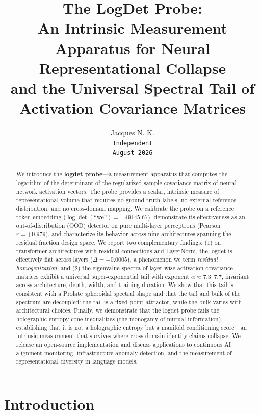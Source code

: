 \documentclass[12pt,a4paper]{article}
\title{
    {\Large The LogDet Probe:}\\
    {\large An Intrinsic Measurement Apparatus for Neural Representational Collapse\\
    and the Universal Spectral Tail of Activation Covariance Matrices}
}
\author{
    Jacques N. K.\\
    \small\texttt{Independent}\\[4pt]
    \small\texttt{August 2026}
}
\date{}
\begin{document}
\maketitle

\begin{abstract}
We introduce the \textbf{logdet probe}---a measurement apparatus that computes the logarithm of the determinant of the regularized sample covariance matrix of neural network activation vectors. The probe provides a scalar, intrinsic measure of representational volume that requires no ground-truth labels, no external reference distribution, and no cross-domain mapping. We calibrate the probe on a reference token embedding ($\log\det(\text{``we''}) = -49145.67$), demonstrate its effectiveness as an out-of-distribution (OOD) detector on pure multi-layer perceptrons (Pearson $r = +0.979$), and characterize its behavior across nine architectures spanning the residual fraction design space. We report two complementary findings: (1) on transformer architectures with residual connections and LayerNorm, the logdet is effectively flat across layers ($\Delta = -0.0005$), a phenomenon we term \textit{residual homogenization}; and (2) the eigenvalue spectra of layer-wise activation covariance matrices exhibit a universal super-exponential tail with exponent $\alpha \approx 7.3$--$7.7$, invariant across architecture, depth, width, and training duration. We show that this tail is consistent with a Prolate spheroidal spectral shape and that the tail and bulk of the spectrum are decoupled: the tail is a fixed-point attractor, while the bulk varies with architectural choices. Finally, we demonstrate that the logdet probe fails the holographic entropy cone inequalities (the monogamy of mutual information), establishing that it is not a holographic entropy but a manifold conditioning score---an intrinsic measurement that survives where cross-domain identity claims collapse. We release an open-source implementation and discuss applications to continuous AI alignment monitoring, infrastructure anomaly detection, and the measurement of representational diversity in language models.
\end{abstract}

\section{Introduction}
\end{document}
